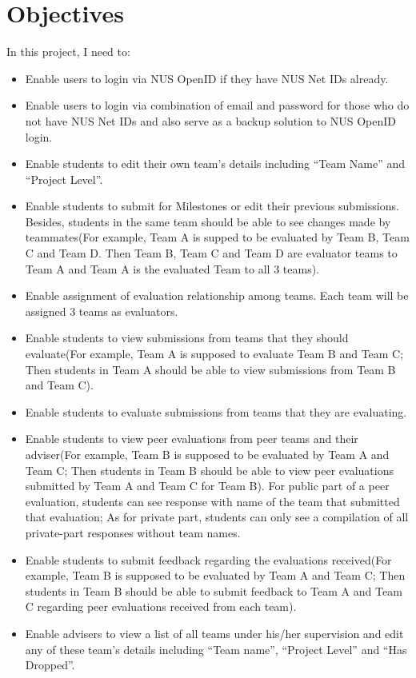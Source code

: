 \section{Objectives}

In this project, I need to:
\begin{itemize}
  \item Enable users to login via NUS OpenID if they have NUS Net IDs already.
  \item Enable users to login via combination of email and password for those who do not have NUS Net IDs and also serve as a backup solution to NUS OpenID login.
  \item Enable students to edit their own team's details including ``Team Name'' and ``Project Level''.
  \item Enable students to submit for Milestones or edit their previous submissions. Besides, students in the same team should be able to see changes made by teammates(For example, Team A is supped to be evaluated by Team B, Team C and Team D. Then Team B, Team C and Team D are evaluator teams to Team A and Team A is the evaluated Team to all 3 teams).
  \item Enable assignment of evaluation relationship among teams. Each team will be assigned 3 teams as evaluators.
  \item Enable students to view submissions from teams that they should evaluate(For example, Team A is supposed to evaluate Team B and Team C; Then students in Team A should be able to view submissions from Team B and Team C).
  \item Enable students to evaluate submissions from teams that they are evaluating.
  \item Enable students to view peer evaluations from peer teams and their adviser(For example, Team B is supposed to be evaluated by Team A and Team C; Then students in Team B should be able to view peer evaluations submitted by Team A and Team C for Team B). For public part of a peer evaluation, students can see response with name of the team that submitted that evaluation; As for private part, students can only see a compilation of all private-part responses without team names.
  \item Enable students to submit feedback regarding the evaluations received(For example, Team B is supposed to be evaluated by Team A and Team C; Then students in Team B should be able to submit feedback to Team A and Team C regarding peer evaluations received from each team).
  \item Enable advisers to view a list of all teams under his/her supervision and edit any of these team's details including ``Team name'', ``Project Level'' and ``Has Dropped''.

\end{itemize}
